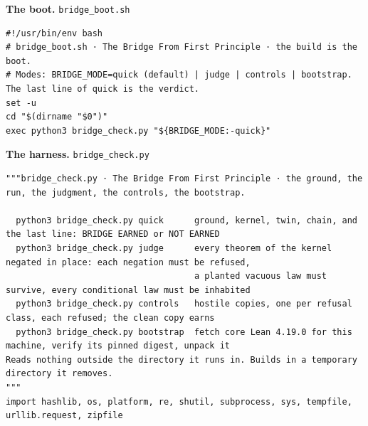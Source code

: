 \documentclass[10pt,twocolumn]{article}
\begin{document}
\textbf{The boot.} \texttt{bridge\_\allowbreak{}boot.sh}

\begin{Verbatim}
#!/usr/bin/env bash
# bridge_boot.sh · The Bridge From First Principle · the build is the boot.
# Modes: BRIDGE_MODE=quick (default) | judge | controls | bootstrap. The last line of quick is the verdict.
set -u
cd "$(dirname "$0")"
exec python3 bridge_check.py "${BRIDGE_MODE:-quick}"
\end{Verbatim}

\textbf{The harness.} \texttt{bridge\_\allowbreak{}check.py}

\begin{Verbatim}
"""bridge_check.py · The Bridge From First Principle · the ground, the run, the judgment, the controls, the bootstrap.

  python3 bridge_check.py quick      ground, kernel, twin, chain, and the last line: BRIDGE EARNED or NOT EARNED
  python3 bridge_check.py judge      every theorem of the kernel negated in place: each negation must be refused,
                                     a planted vacuous law must survive, every conditional law must be inhabited
  python3 bridge_check.py controls   hostile copies, one per refusal class, each refused; the clean copy earns
  python3 bridge_check.py bootstrap  fetch core Lean 4.19.0 for this machine, verify its pinned digest, unpack it
Reads nothing outside the directory it runs in. Builds in a temporary directory it removes.
"""
import hashlib, os, platform, re, shutil, subprocess, sys, tempfile, urllib.request, zipfile


\end{Verbatim}
\end{document}
